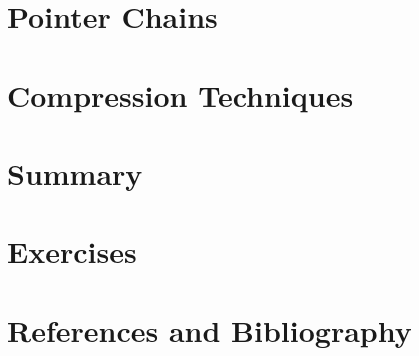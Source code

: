 \documentclass{book}
\begin{document}
\section{Pointer Chains}

\section{Compression Techniques}

\section{Summary}

\section{Exercises}

\section{References and Bibliography}
\end{document}
